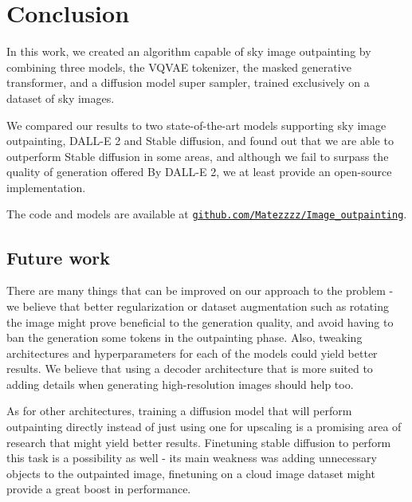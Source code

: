 \chapter*{Conclusion}

In this work, we created an algorithm capable of sky image outpainting by combining three models, the VQVAE tokenizer, the masked generative transformer, and a diffusion model super sampler, trained exclusively on a dataset of sky images.

We compared our results to two state-of-the-art models supporting sky image outpainting, DALL-E 2 and Stable diffusion, and found out that we are able to outperform Stable diffusion in some areas, and although we fail to surpass the quality of generation offered By DALL-E 2, we at least provide an open-source implementation.

The code and models are available at \texttt{\href{https://github.com/Matezzzz/Image_outpainting}{github.com/Matezzzz/Image\_outpainting}}.

\section*{Future work}

There are many things that can be improved on our approach to the problem - we believe that better regularization or dataset augmentation such as rotating the image might prove beneficial to the generation quality, and avoid having to ban the generation some tokens in the outpainting phase. Also, tweaking architectures and hyperparameters for each of the models could yield better results. We believe that using a decoder architecture that is more suited to adding details when generating high-resolution images should help too.

As for other architectures, training a diffusion model that will perform outpainting directly instead of just using one for upscaling is a promising area of research that might yield better results. Finetuning stable diffusion to perform this task is a possibility as well - its main weakness was adding unnecessary objects to the outpainted image, finetuning on a cloud image dataset might provide a great boost in performance.